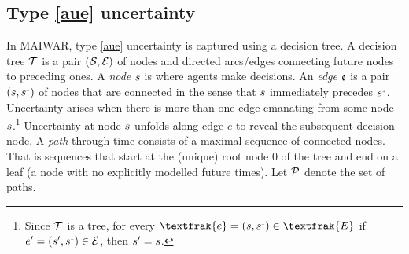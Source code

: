 \documentclass[12pt,a4paper,twoside, draft]{article}
\begin{document}
\subsection{Type \ref{aue} uncertainty}
In MAIWAR, type \ref{aue} uncertainty is captured using a decision tree.
A decision tree $\mathcal T$ is a pair $(\mathcal{S}, \mathcal{E})$ of nodes and directed
arcs/edges connecting future nodes to preceding ones.
A \emph{node} ${s}$ is where agents make decisions.
An \emph{edge} $\mathfrak{e}$ is a pair $(\node, \node^{\mplus})$
of nodes that are connected in the sense that ${s}$ immediately
precedes $\node^{\mplus}$.
Uncertainty arises when there is more than one edge emanating from some node
${s}$.\footnote{
  Since $\mathcal T$ is a tree, for every
  $\textfrak{e} = (\node, \node^{\mplus}) \in \textfrak{E}$
  if $e' = (\node', \node^{\mplus}) \in \mc E$,
  then ${s}' = {s}$.
}
Uncertainty at node ${s}$ unfolds along edge $e$ to reveal the subsequent
decision node.
A \emph{path} through time consists of a maximal sequence of connected nodes.
That is sequences that start at the (unique) root node $\mathfrak{0}$ of the
tree and end on a leaf (a node with no explicitly modelled future times).
Let $\mathcal P$ denote the set of paths.
\end{document}
